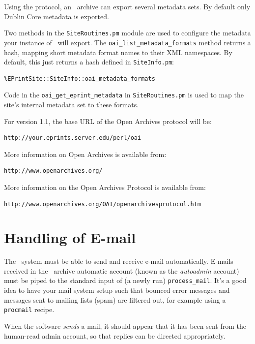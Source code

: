 Using the protocol, an \eprints\ archive can export several metadata sets. By default only Dublin Core metadata is exported.

Two methods in the {\tt SiteRoutines.pm} module are used to configure the metadata your instance of \eprints\ will export. The {\tt oai\_list\_metadata\_formats} method returns a hash, mapping short metadata format names to their XML namespaces. By default, this just returns a hash defined in {\tt SiteInfo.pm}:

\begin{verbatim}
%EPrintSite::SiteInfo::oai_metadata_formats
\end{verbatim}

Code in the {\tt oai\_get\_eprint\_metadata} in {\tt SiteRoutines.pm} is used to map the site's internal metadata set to these formats.

For version 1.1, the base URL of the Open Archives protocol will be:

\begin{verbatim}
http://your.eprints.server.edu/perl/oai
\end{verbatim}

More information on Open Archives is available from:
\begin{verbatim}
http://www.openarchives.org/
\end{verbatim}

More information on the Open Archives Protocol is available from:
\begin{verbatim}
http://www.openarchives.org/OAI/openarchivesprotocol.htm
\end{verbatim}




\section{Handling of E-mail}

The \eprints\ system must be able to send and receive e-mail automatically. E-mails received in the \eprints\ archive automatic account (known as the \emph{autoadmin} account) must be piped to the standard input of (a newly run) {\tt process\_mail}. It's a good idea to have your mail system setup such that bounced error messages and messages sent to mailing lists (spam) are filtered out, for example using a {\tt procmail} recipe.

When the software \emph{sends} a mail, it should appear that it has been sent from the human-read admin account, so that replies can be directed appropriately.

